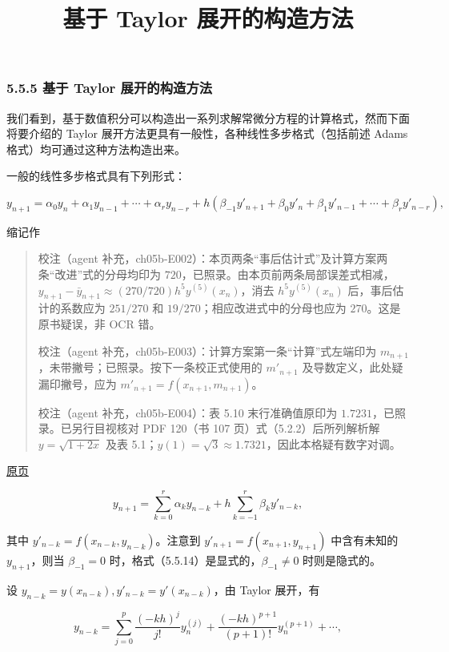 \documentclass[
  10pt,
  fontset=fandol]{ctexart}
\title{基于 Taylor 展开的构造方法}
\author{}
\date{}
\begin{document}
\maketitle

\subsubsection{5.5.5 基于 Taylor 展开的构造方法}\label{ux57faux4e8e-taylor-ux5c55ux5f00ux7684ux6784ux9020ux65b9ux6cd5}

我们看到，基于数值积分可以构造出一系列求解常微分方程的计算格式，然而下面将要介绍的 Taylor 展开方法更具有一般性，各种线性多步格式（包括前述 Adams 格式）均可通过这种方法构造出来。

一般的线性多步格式具有下列形式：

\[
y_{n+1}=\alpha_0y_n+\alpha_1y_{n-1}+\cdots+\alpha_ry_{n-r}+h(\beta_{-1}y'_{n+1}+\beta_0y'_n+\beta_1y'_{n-1}+\cdots+\beta_ry'_{n-r}),
\]

缩记作

\begin{quote}
校注（agent 补充，ch05b-E002）：本页两条``事后估计式''及计算方案两条``改进''式的分母均印为 \(720\)，已照录。由本页前两条局部误差式相减，\(y_{n+1}-\bar y_{n+1}\approx(270/720)h^5y^{(5)}(x_n)\)，消去 \(h^5y^{(5)}(x_n)\) 后，事后估计的系数应为 \(251/270\) 和 \(19/270\)；相应改进式中的分母也应为 \(270\)。这是原书疑误，非 OCR 错。

校注（agent 补充，ch05b-E003）：计算方案第一条``计算''式左端印为 \(m_{n+1}\)，未带撇号；已照录。按下一条校正式使用的 \(m'_{n+1}\) 及导数定义，此处疑漏印撇号，应为 \(m'_{n+1}=f(x_{n+1},m_{n+1})\)。

校注（agent 补充，ch05b-E004）：表 5.10 末行准确值原印为 \(1.7231\)，已照录。已另行目视核对 PDF 120（书 107 页）式（5.2.2）后所列解析解 \(y=\sqrt{1+2x}\) 及表 5.1；\(y(1)=\sqrt3\approx1.7321\)，因此本格疑有数字对调。
\end{quote}

\href{../../source-images/pdf-142.jpeg}{原页}

\[
y_{n+1}=\sum_{k=0}^r\alpha_ky_{n-k}+h\sum_{k=-1}^r\beta_ky'_{n-k},
\tag{5.5.14}
\]

其中 \(y'_{n-k}=f(x_{n-k},y_{n-k})\)。注意到 \(y'_{n+1}=f(x_{n+1},y_{n+1})\) 中含有未知的 \(y_{n+1}\)，则当 \(\beta_{-1}=0\) 时，格式（5.5.14）是显式的，\(\beta_{-1}\ne0\) 时则是隐式的。

设 \(y_{n-k}=y(x_{n-k}),y'_{n-k}=y'(x_{n-k})\)，由 Taylor 展开，有

\[
y_{n-k}=\sum_{j=0}^p\frac{(-kh)^j}{j!}y_n^{(j)}+\frac{(-kh)^{p+1}}{(p+1)!}y_n^{(p+1)}+\cdots,
\]
\end{document}
